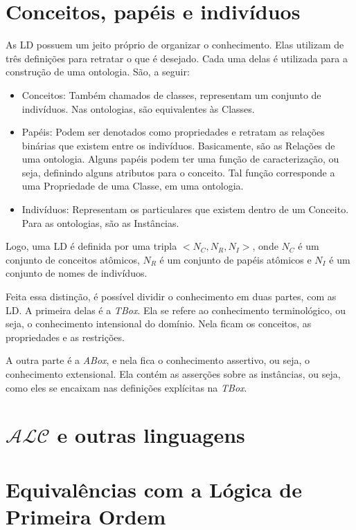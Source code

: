 \section{Conceitos, papéis e indivíduos}

As LD possuem um jeito próprio de organizar o conhecimento. Elas utilizam de três definições para retratar o que é desejado. Cada uma delas é utilizada para a construção de uma ontologia. São, a seguir:

\begin{itemize}
	\item Conceitos: Também chamados de classes, representam um conjunto de indivíduos. Nas ontologias, são equivalentes às Classes.
	\item Papéis: Podem ser denotados como propriedades e retratam as relações binárias que existem entre os indivíduos. Basicamente, são as Relações de uma ontologia. Alguns papéis podem ter uma função de caracterização, ou seja, definindo alguns atributos para o conceito. Tal função corresponde a uma Propriedade de uma Classe, em uma ontologia.
	\item Indivíduos: Representam os particulares que existem dentro de um Conceito. Para as ontologias, são as Instâncias.
\end{itemize}

Logo, uma LD é definida por uma tripla $ <N_C, N_R, N_I> $, onde $ N_C $ é um conjunto de conceitos atômicos, $ N_R $ é um conjunto de papéis atômicos e $ N_I $ é um conjunto de nomes de indivíduos.

Feita essa distinção, é possível dividir o conhecimento em duas partes, com as LD. A primeira delas é a \textit{TBox}. Ela se refere ao conhecimento terminológico, ou seja, o conhecimento intensional do domínio. Nela ficam os conceitos, as propriedades e as restrições.

A outra parte é a \textit{ABox}, e nela fica o conhecimento assertivo, ou seja, o conhecimento extensional. Ela contém as asserções sobre as instâncias, ou seja, como eles se encaixam nas definições explícitas na \textit{TBox}.

\section{$\mathcal{ALC}$ e outras linguagens}

\section{Equivalências com a Lógica de Primeira Ordem}

